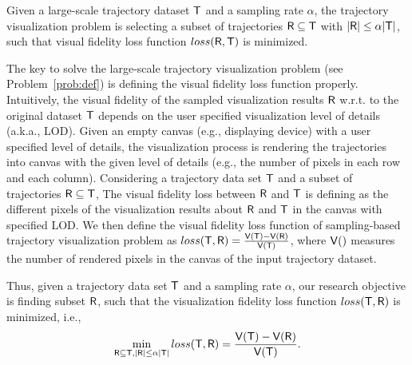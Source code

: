 \begin{problem}\label{prob:def}
Given a large-scale trajectory dataset $\mathsf{T}$ and a sampling rate $\alpha$,
the trajectory visualization problem is selecting a subset of trajectories $\mathsf{R} \subseteq \mathsf{T}$ with $|\mathsf{R}| \leq \alpha |\mathsf{T}|$, 
such that visual fidelity loss function $loss(\mathsf{R},\mathsf{T})$ is minimized.
\end{problem}



The key to solve the large-scale trajectory visualization problem (see Problem~\ref{prob:def}) is defining the visual fidelity loss function properly.
Intuitively, the visual fidelity of the sampled visualization results $\mathsf{R}$ w.r.t. to the original dataset $\mathsf{T}$ depends on the user specified visualization level of details (a.k.a., LOD).
Given an empty canvas (e.g., displaying device) with a user specified level of details,
the visualization process is rendering the trajectories into canvas with the given level of details (e.g., the number of pixels in each row and each column).
Considering a trajectory data set $\mathsf{T}$ and a subset of trajectories $\mathsf{R} \subseteq \mathsf{T}$,
The visual fidelity loss between $\mathsf{R}$ and $\mathsf{T}$ is defining as the different pixels of the visualization results about $\mathsf{R}$ and $\mathsf{T}$ in the canvas with specified LOD.
We then define the visual fidelity loss function of sampling-based trajectory visualization problem as $loss(\mathsf{T}, \mathsf{R}) = \frac{\mathsf{V}(\mathsf{T}) - \mathsf{V}(\mathsf{R})}{\mathsf{V}(\mathsf{T})}$,
where $\mathsf{V}()$ measures the number of rendered pixels in the canvas of the input trajectory dataset.

Thus, given a trajectory data set $\mathsf{T}$ and a sampling rate $\alpha$, 
our research objective is finding subset $\mathsf{R}$, such that  the visualization fidelity loss function $loss(\mathsf{T}, \mathsf{R})$ is minimized,
i.e., 
$$ \min_{\mathsf{R} \subseteq \mathsf{T}, |\mathsf{R}| \leq \alpha |\mathsf{T}|}  loss(\mathsf{T}, \mathsf{R}) =  \frac{\mathsf{V}(\mathsf{T}) - \mathsf{V}(\mathsf{R})}{\mathsf{V}(\mathsf{T})}. $$ %



